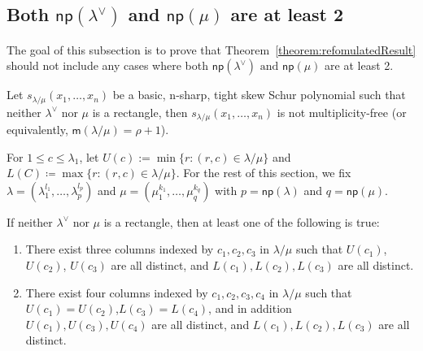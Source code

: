 \documentclass[ALCO,ThmDefs,Unicode,epreuves]{cedram}
\newcommand{\np}{\mathsf{np}}
\newcommand{\msf}{\mathsf{m}}
\begin{document}
\subsection{Both \texorpdfstring{$\np (\lambda^\vee)$}{np(lambda vee)} and \texorpdfstring{$\np (\mu)$}{np(mu)} are at least 2}

The goal of this subsection is to prove that Theorem~\ref{theorem:refomulatedResult} should not include any cases where both $\np (\lambda^\vee) \text{ and }\np (\mu)$ are at least 2.

\begin{theorem}
\label{thm:lambdamunotrectangle}
Let $s_{\lambda/\mu}(x_1,\ldots,x_n)$ be a basic, n-sharp, tight skew Schur polynomial such that neither $\lambda^\vee$ nor $\mu$ is a rectangle, then $s_{\lambda/\mu}(x_1,\ldots,x_n)$ is not multiplicity-free (or equivalently, $\msf (\lambda/\mu) = \rho+1$).
\end{theorem}

For $1 \leq c \leq \lambda_1$, let $U(c) := \min\{r:(r,c)\in \lambda / \mu\}$ and $L(C) \coloneqq \max\{r:(r,c)\in \lambda / \mu\}$. For the rest of this section, we fix $\lambda = (\lambda_1^{l_1},\dots, \lambda_p^{l_p})$ and $\mu = (\mu_1^{k_1},\dots, \mu_q^{k_q})$ with $p = \np (\lambda)$ and $q = \np (\mu)$.


\begin{lemma}
\label{lem:nonrect}
 If neither $\lambda^\vee$ nor $\mu$ is a rectangle, then at least one of the following is true:
 \begin{enumerate}[label=(\Roman{*})]
 \item\label{lemma3.4_1} There exist three columns indexed by $c_1,c_2,c_3$ in $\lambda/\mu$ such that $U(c_1)$, $U(c_2)$, $U(c_3)$ are all distinct, and $L(c_1),L(c_2),L(c_3)$ are all distinct.
 \item\label{lemma3.4_2} There exist four columns indexed by $c_1,c_2,c_3,c_4$ in $\lambda/\mu$ such that $U(c_1)=U(c_2)$,$L(c_3)=L(c_4)$, and in addition $U(c_1),U(c_3),U(c_4)$ are all distinct, and $L(c_1),L(c_2),L(c_3)$ are all distinct.
 \end{enumerate}
\end{lemma}
\end{document}
